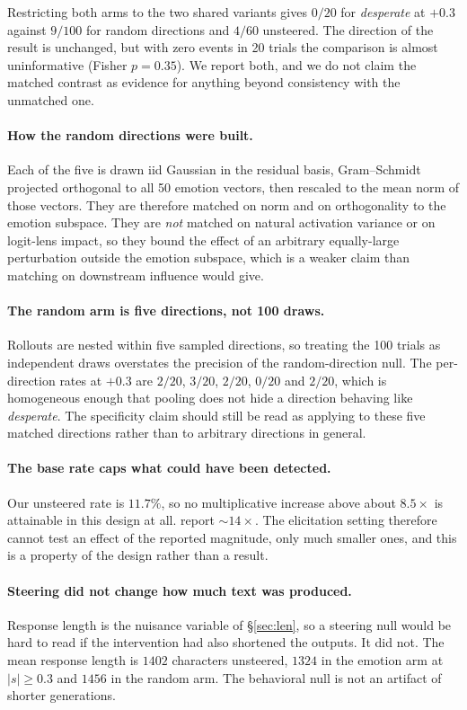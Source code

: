 Restricting both arms to the two shared variants gives $0/20$ for \emph{desperate}
at $+0.3$ against $9/100$ for random directions and $4/60$ unsteered. The direction
of the result is unchanged, but with zero events in 20 trials the comparison is
almost uninformative (Fisher $p = 0.35$). We report both, and we do not claim the
matched contrast as evidence for anything beyond consistency with the unmatched one.

\paragraph{How the random directions were built.} Each of the five is drawn iid
Gaussian in the residual basis, Gram--Schmidt projected orthogonal to all 50
emotion vectors, then rescaled to the mean norm of those vectors. They are
therefore matched on norm and on orthogonality to the emotion subspace. They are
\emph{not} matched on natural activation variance or on logit-lens impact, so they
bound the effect of an arbitrary equally-large perturbation outside the emotion
subspace, which is a weaker claim than matching on downstream influence would give.

\paragraph{The random arm is five directions, not 100 draws.} Rollouts are nested
within five sampled directions, so treating the 100 trials as independent draws
overstates the precision of the random-direction null. The per-direction rates at
$+0.3$ are $2/20$, $3/20$, $2/20$, $0/20$ and $2/20$, which is homogeneous enough
that pooling does not hide a direction behaving like \emph{desperate}. The
specificity claim should still be read as applying to these five matched directions
rather than to arbitrary directions in general.

\paragraph{The base rate caps what could have been detected.} Our unsteered rate is
$11.7\%$, so no multiplicative increase above about $8.5\times$ is attainable in this
design at all. \citet{sofroniew2026} report ${\sim}14\times$. The elicitation setting
therefore cannot test an effect of the reported magnitude, only much smaller ones,
and this is a property of the design rather than a result.

\paragraph{Steering did not change how much text was produced.} Response length is
the nuisance variable of \S\ref{sec:len}, so a steering null would be hard to read
if the intervention had also shortened the outputs. It did not. The mean response length
is $1402$ characters unsteered, $1324$ in the emotion arm at $|s| \ge 0.3$ and $1456$
in the random arm. The behavioral null is not an artifact of shorter generations.

